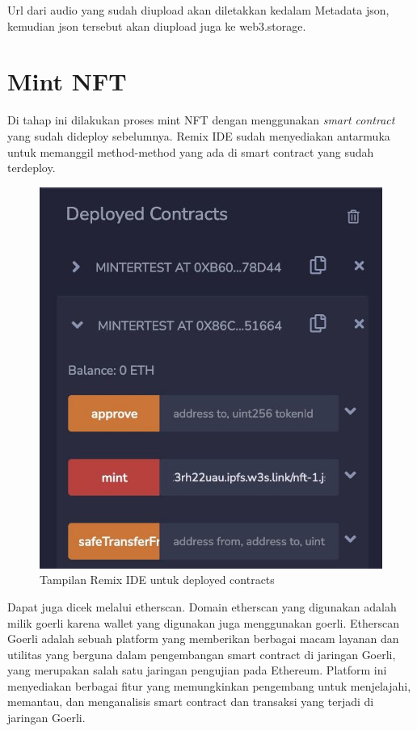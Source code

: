 Url dari audio yang sudah diupload akan diletakkan kedalam Metadata json, kemudian json tersebut akan diupload juga
ke web3.storage.

\section{Mint NFT}

Di tahap ini dilakukan proses mint NFT dengan menggunakan \emph{smart contract} yang sudah dideploy sebelumnya.
Remix IDE sudah menyediakan antarmuka untuk memanggil method-method yang ada di smart contract yang sudah terdeploy.

\begin{figure}[H]
  \centering

  \includegraphics[scale=0.3]{gambar/mint-nft.jpg}

  \caption{Tampilan Remix IDE untuk deployed contracts}
  \label{fig:mintnft}
\end{figure}

Dapat juga dicek melalui etherscan. Domain etherscan yang digunakan adalah milik goerli karena wallet yang digunakan juga menggunakan goerli.
Etherscan Goerli adalah sebuah platform yang memberikan berbagai macam layanan dan utilitas yang berguna dalam pengembangan smart contract di jaringan Goerli, yang merupakan salah satu jaringan pengujian pada Ethereum. Platform ini menyediakan berbagai fitur yang memungkinkan pengembang untuk menjelajahi, memantau, dan menganalisis smart contract dan transaksi yang terjadi di jaringan Goerli.

